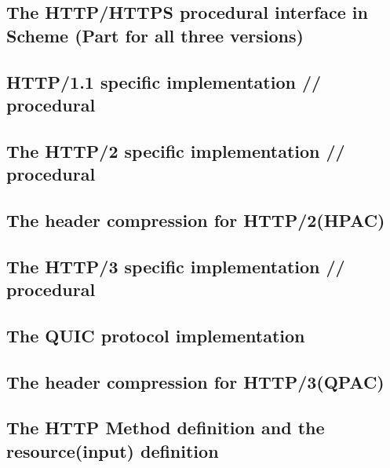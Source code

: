 \documentclass[10pt,a4paper,english]{article}
\begin{document}
\begin{multicols}{2}
\subsection{The HTTP/HTTPS procedural interface in  Scheme (Part for all three versions)}
\begin{flushleft}
\end{flushleft}
\subsection{HTTP/1.1 specific implementation // procedural}
\begin{flushleft}
\end{flushleft}
\subsection{The HTTP/2 specific implementation // procedural}
\begin{flushleft}
\end{flushleft}
\subsection{The header compression for HTTP/2(HPAC)}
\begin{flushleft}
\end{flushleft}
\subsection{The HTTP/3 specific implementation // procedural}
\begin{flushleft}
\end{flushleft}
\subsection{The QUIC protocol implementation}
\begin{flushleft}
\end{flushleft}
\subsection{The header compression for HTTP/3(QPAC)}
\begin{flushleft}
\end{flushleft}
\subsection{The HTTP Method definition and the resource(input) definition}
\begin{flushleft}
\end{flushleft}

\end{multicols}
\end{document}
